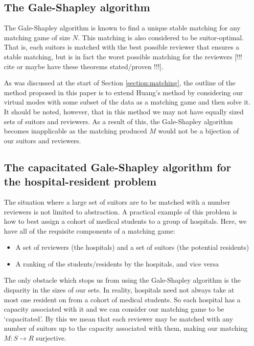 \documentclass{article}
\theoremstyle{definition}
\begin{document}
\subsection{The Gale-Shapley algorithm}\label{subsection:galeshapley}

The Gale-Shapley algorithm is known to find a unique stable matching for any 
matching game of size $N$. This matching is also considered to be 
suitor-optimal. That is, each suitors is matched with the best possible reviewer
that ensures a stable matching, but is in fact the worst possible matching for 
the reviewers [!!! cite or maybe have these theorems stated/proven !!!]. 

As was discussed at the start of Section \ref{section:matching}, the outline of
the method proposed in this paper is to extend Huang's method by considering our
virtual modes with some subset of the data as a matching game and then solve it.
It should be noted, however, that in this method we may not have equally sized 
sets of suitors and reviewers. As a result of this, the Gale-Shapley algorithm 
becomes inapplicable as the matching produced $M$ would not be a bijection of 
our suitors and reviewers.

\subsection{The capacitated Gale-Shapley algorithm for the hospital-resident 
		problem}\label{subsection:capacitated-galeshapley}

The situation where a large set of suitors are to be matched with a number
reviewers is not limited to abstraction. A practical example of this problem is
how to best assign a cohort of medical students to a group of hospitals. Here, 
we have all of the requisite components of a matching game:

\begin{itemize}
	\item A set of reviewers (the hospitals) and a set of suitors (the potential
        residents) 
	\item A ranking of the students/residents by the hospitals, and vice versa
\end{itemize}

The only obstacle which stops us from using the Gale-Shapley algorithm is the 
disparity in the sizes of our sets. In reality, hospitals need not always take 
at most one resident on from a cohort of medical students. So each hospital has
a capacity associated with it and we can consider our matching game to be
`capacitated'. By this we mean that each reviewer may be matched with any number
of suitors up to the capacity associated with them, making our matching $M: S 
\to R$ surjective. \\
\end{document}
